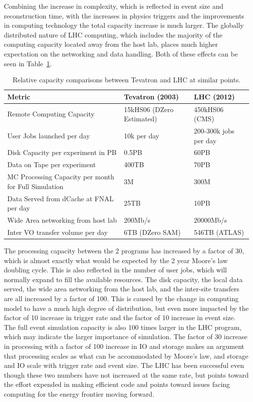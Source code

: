 Combining the increase in complexity, which is reflected in event size
and reconstruction time, with the increases in physics triggers and
the improvements in computing technology the total capacity increase
is much larger.  The globally distributed nature of LHC computing,
which includes the majority of the computing capacity located away
from the host lab, places much higher expectation on the networking
and data handling.  Both of these effects can be seen in
Table~\ref{tab:compare_comp}.

\begin{table}[t]
\begin{center}
\begin{tabular}{lll}
Metric & Tevatron (2003) & LHC (2012) \\ \hline
Remote Computing Capacity & 15kHS06 (DZero Estimated) & 450kHS06 (CMS) \\
User Jobs launched per day & 10k per day & 200-300k jobs per day \\
Disk Capacity per experiment in PB & 0.5PB & 60PB \\
Data on Tape per experiment  & 400TB & 70PB \\
MC Processing Capacity per month for Full Simulation & 3M & 300M \\
Data Served from dCache at FNAL per day & 25TB & 10PB \\
Wide Area networking from host lab & 200Mb/s & 20000Mb/s \\
Inter VO transfer volume per day & 6TB (DZero SAM) & 546TB (ATLAS) \\ \hline
\end{tabular}
\caption{Relative capacity comparisons between Tevatron and LHC at similar points.}
\label{tab:compare_comp}
\end{center}
\end{table}


The processing capacity between the 2 programs has increased by a
factor of 30, which is almost exactly what would be expected by the 2
year Moore's law doubling cycle.  This is also reflected in the number
of user jobs, which will normally expand to fill the available
resources.  The disk capacity, the local data served, the wide area
networking from the host lab, and the inter-site transfers are all
increased by a factor of 100.  This is caused by the change in
computing model to have a much high degree of distribution, but even
more impacted by the factor of 10 increase in trigger rate and the
factor of 10 increase in event size.  The full event simulation
capacity is also 100 times larger in the LHC program, which may
indicate the larger importance of simulation.  The factor of 30
increase in processing with a factor of 100 increase in IO and storage
makes an argument that processing scales as what can be accommodated
by Moore's law, and storage and IO scale with trigger rate and event
size.  The LHC has been successful even though these two numbers have
not increased at the same rate, but points toward the effort expended
in making efficient code and points toward issues facing computing for
the energy frontier moving forward.

